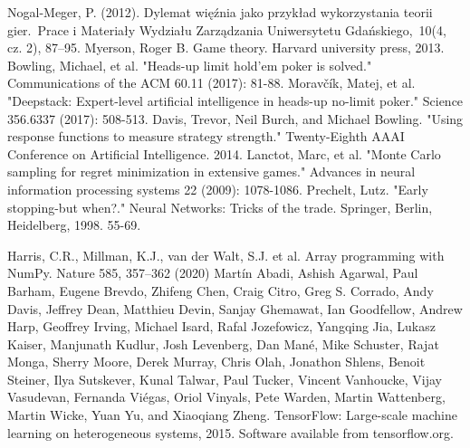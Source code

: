 \documentclass[12pt,oneside,a4paper]{report}
\begin{document}
\begin{thebibliography}{100}
     Nogal-Meger, P. (2012). Dylemat więźnia jako przykład wykorzystania teorii gier. Prace i Materiały Wydziału Zarządzania Uniwersytetu Gdańskiego, 10(4, cz. 2), 87–95.
    Myerson, Roger B. Game theory. Harvard university press, 2013.
    Bowling, Michael, et al. "Heads-up limit hold'em poker is solved." Communications of the ACM 60.11 (2017): 81-88.
    Moravčík, Matej, et al. "Deepstack: Expert-level artificial intelligence in heads-up no-limit poker." Science 356.6337 (2017): 508-513. 
    Davis, Trevor, Neil Burch, and Michael Bowling. "Using response functions to measure strategy strength." Twenty-Eighth AAAI Conference on Artificial Intelligence. 2014. 
    Lanctot, Marc, et al. "Monte Carlo sampling for regret minimization in extensive games." Advances in neural information processing systems 22 (2009): 1078-1086.
    Prechelt, Lutz. "Early stopping-but when?." Neural Networks: Tricks of the trade. Springer, Berlin, Heidelberg, 1998. 55-69.

    Harris, C.R., Millman, K.J., van der Walt, S.J. et al. Array programming with NumPy. Nature 585, 357–362 (2020)
    Martín Abadi, Ashish Agarwal, Paul Barham, Eugene Brevdo,
Zhifeng Chen, Craig Citro, Greg S. Corrado, Andy Davis,
Jeffrey Dean, Matthieu Devin, Sanjay Ghemawat, Ian Goodfellow,
Andrew Harp, Geoffrey Irving, Michael Isard, Rafal Jozefowicz, Yangqing Jia,
Lukasz Kaiser, Manjunath Kudlur, Josh Levenberg, Dan Mané, Mike Schuster,
Rajat Monga, Sherry Moore, Derek Murray, Chris Olah, Jonathon Shlens,
Benoit Steiner, Ilya Sutskever, Kunal Talwar, Paul Tucker,
Vincent Vanhoucke, Vijay Vasudevan, Fernanda Viégas,
Oriol Vinyals, Pete Warden, Martin Wattenberg, Martin Wicke,
Yuan Yu, and Xiaoqiang Zheng.
TensorFlow: Large-scale machine learning on heterogeneous systems,
2015. Software available from tensorflow.org.
\end{thebibliography}
\end{document}
